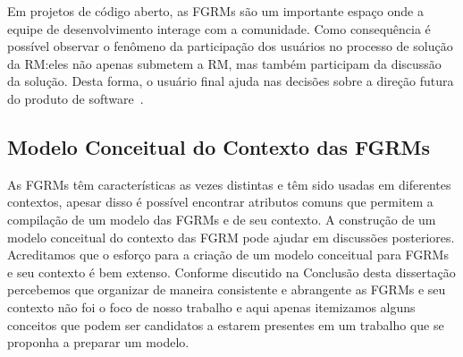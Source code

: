 Em projetos de código aberto, as FGRMs são um importante espaço onde a equipe de
desenvolvimento interage com a comunidade. Como consequência é possível observar
o fenômeno da participação dos usuários no processo de solução da RM:\@ eles não
apenas submetem a RM, mas também participam da discussão da solução. Desta
forma, o usuário final ajuda nas decisões sobre a direção futura do produto de
software~\cite{breu2010information}.

\subsection{Modelo Conceitual do Contexto das FGRMs}
\label{sub:espectro_funcionalidades_fgrm}

As FGRMs têm características as vezes distintas e têm sido usadas em diferentes
contextos, apesar disso é possível encontrar atributos comuns que permitem a
compilação de um modelo das FGRMs e de seu contexto. A construção de um modelo
conceitual do contexto das FGRM pode ajudar em discussões posteriores.
Acreditamos que o esforço para a criação de um modelo conceitual para FGRMs e
seu contexto é bem extenso. Conforme discutido na Conclusão desta dissertação
percebemos que organizar de maneira consistente e abrangente as FGRMs e seu
contexto não foi o foco de nosso trabalho e aqui apenas itemizamos alguns
conceitos que podem ser candidatos a estarem presentes em um trabalho que se
proponha a preparar um modelo.



